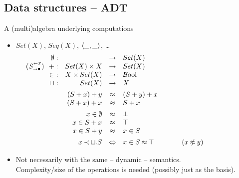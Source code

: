 \documentclass[leqno]{article}
\begin{document}
\subsection{Data structures -- ADT}
A (multi)algebra  underlying computations
\begin{itemize}
\item $Set(X)$, $Seq(X)$, $\langle\_,\_\rangle$, \ldots 
\[ \hspace*{-3em}\begin{array}{l@{\hspace*{3em}}l}
\begin{array}[t]{rrcl}
\es : & & \into & Set(X) \\
(\add Sx)\ \ + : & Set(X)\times X & \into & Set(X) \\
\in\ : & X \times Set(X) & \into & \bool \\
\ch: & Set(X) & \into & X \\[1ex]
\multicolumn{2}{r} { (S+x)+y } & \Eq & (S+y)+x \\
\multicolumn{2}{r}{ (S+x)+x } & \Eq & S+x \\[1ex]
\multicolumn{2}{r}{ x\in\es } & \Eq & \false \\
\multicolumn{2}{r}{ x\in S+x } & \Eq & \true \\
\multicolumn{2}{r}{ x\in S+y }& \Eq & x\in S \\[1ex]
\multicolumn{2}{r}{ x\Incl \ch.S} & \Iff & x\in S\Eq\true 
\hspace*{4em} (x\notEq y)
\end{array}
&
\end{array}
\]
%
\item
Not necessarily with the same -- dynamic -- semantics. \\
Complexity/size of the operations is needed (possibly just as the basis).
\end{itemize}
\end{document}
